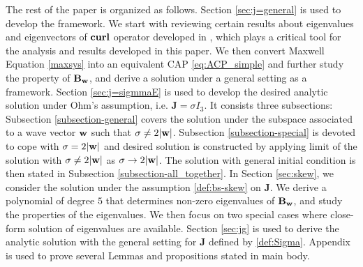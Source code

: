 \documentclass[10pt,reqno]{amsart}
\newcommand{\bB}{{\bf B}}
\renewcommand{\(}{\left(}
\renewcommand{\)}{\right)}
\newcommand{\bw}{{\bf w}}
\newcommand{\CU}{{\bf curl}}
\newcommand{\bJ}{\mathbf{J}}
\numberwithin{equation}{section}
\begin{document}
The rest of the paper is organized as follows. Section \ref{sec:j=general} is used to develop the framework. We start with reviewing certain results about eigenvalues and eigenvectors of $\CU$ operator developed in \cite{zou_maxwell}, which plays a critical tool for the analysis and results developed in this paper.  We then convert Maxwell Equation \ref{maxsys} into an equivalent CAP \ref{eq:ACP_simple} and further study the property of $\bB_{\bw}$, and derive a solution under a general setting as a framework.  Section \ref{sec:j=sigmmaE} is used to develop the desired analytic solution under Ohm's assumption, i.e. $\bJ = \sigma I_3$. It consists three subsections:  Subsection \ref{subsection-general} covers the solution under the subspace associated to a wave vector $\bw$ such that $\sigma\neq 2|\bw|$. Subsection \ref{subsection-special} is devoted to cope with $\sigma= 2|\bw|$ and desired solution is constructed by applying limit of the solution with $\sigma\neq 2|\bw|$ as $\sigma\to 2|\bw|$. The solution with general initial condition is then stated in Subsection \ref{subsection-all_together}. In Section \ref{sec:skew}, we consider the solution under the assumption \ref{def:bs-skew} on $\bJ$. We derive a polynomial of degree $5$ that determines non-zero eigenvalues of $\bB_{\bw}$, and study the properties of the eigenvalues.  We then focus on two special cases where close-form solution of eigenvalues are available.  Section \ref{sec:jg} is used to derive the analytic solution with the general setting for $\bJ$ defined by \ref{def:Sigma}.  Appendix is used to prove several Lemmas and propositions stated in main body.
\end{document}
